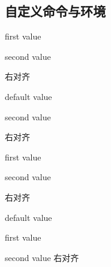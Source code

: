 \documentclass{ctexart}
\begin{document}
    \subsection{自定义命令与环境}

            \newenvironment{newenv0}[2]
            {\begin{flushright}#1\par#2\par}
            {\end{flushright}}

            \begin{newenv0}{first value}{second value}
                右对齐
            \end{newenv0}

            \newenvironment{newenv1}[2][default value]
            {\begin{flushright}#1\par#2\par}
            {\end{flushright}}
            
            \begin{newenv1}{second value}
                右对齐
            \end{newenv1}

            \begin{newenv1}[first value]{second value}
                右对齐
            \end{newenv1}

            \begin{newenv1}{first value}{second value}
                右对齐
            \end{newenv1}
\end{document}
